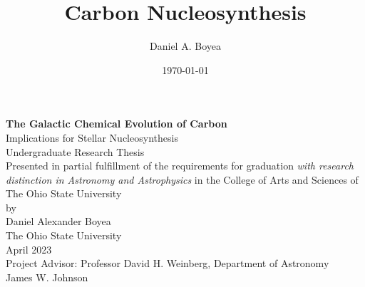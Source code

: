 \documentclass[12pt,oneside]{report}
\title{Carbon Nucleosynthesis}
\author{Daniel A. Boyea}
\date{\today}
\begin{document}


\begin{titlepage}
   \begin{center}
       \vspace*{5\baselineskip}
       \textbf{The Galactic Chemical Evolution of Carbon}\\
       Implications for Stellar Nucleosynthesis\\
       \vspace*{3\baselineskip}
        Undergraduate Research Thesis\\
       \vspace*{3\baselineskip}
    Presented in partial fulfillment of the requirements for graduation \textit{with research distinction in Astronomy and Astrophysics} in the College of Arts and Sciences of The Ohio State University\\
       \vspace*{3\baselineskip}
        by\\
       \vspace*{3\baselineskip}
       {Daniel Alexander Boyea}\\
       \vspace*{3\baselineskip}
       The Ohio State University\\
       April 2023\\
       \vspace*{3\baselineskip}
       Project Advisor: Professor David H. Weinberg, Department of Astronomy \\
       James W. Johnson 
       \vfill
   \end{center}
\end{titlepage}



\end{document}
